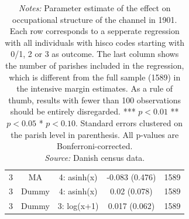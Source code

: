 \begin{table}[]
\begin{tabular}{ccccc}
3 & MA & 4: asinh(x) & -0.083 (0.476) & 1589\\
3 & Dummy & 4: asinh(x) & 0.02 (0.078) & 1589\\
3 & Dummy & 3: log(x+1) & 0.017 (0.062) & 1589\\
\bottomrule
\end{tabular}
\parbox{0.9\textwidth}{
\caption*{\footnotesize \textit{Notes:} Parameter estimate of the effect on occupational structure of the channel in 1901. Each row corresponds to a sepperate regression with all individuals with hisco codes starting with 0/1, 2 or 3 as outcome. The last column shows the number of parishes included in the regression, which is different from the full sample (1589) in the intensive margin estimates. As a rule of thumb, results with fewer than 100 observations should be entirely disregarded. *** $p< 0.01$ ** $p< 0.05$ * $p< 0.10$. Standard errors clustered on the parish level in parenthesis. All p-values are Bonferroni-corrected. \\ \textit{Source:} Danish census data.}
}
\end{table}

